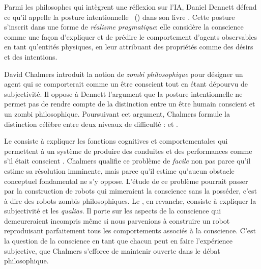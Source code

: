 \begin{quote}
	\cite{bach_california_2025}
\end{quote}

Parmi les philosophes qui intègrent une réflexion sur l'IA, Daniel Dennett défend ce qu'il appelle la \og posture intentionnelle \fg\ () dans son livre  \cite{dennett_consciousness_1991}. 
Cette posture s'inscrit dans une forme de  \textit{réalisme pragmatique}: elle considère la conscience comme une façon d'expliquer et de prédire le comportement d'agents observables en tant qu'entités physiques, en leur attribuant des propriétés comme des désirs et des intentions. 

David Chalmers introduit la notion de \emph{zombi philosophique} pour désigner un agent qui se comporterait comme un être conscient tout en étant dépourvu de subjectivité. 
Il oppose à Dennett l'argument que la posture intentionnelle ne permet pas de rendre compte de la distinction entre un être humain conscient et un zombi philosophique. 
Poursuivant cet argument, 
Chalmers formule la distinction célèbre entre deux niveaux de difficulté :  et  \cite{chalmers_conscious_1997}.

Le  consiste à expliquer les fonctions cognitives et comportementales qui permettent à un système de produire des conduites et des performances \og comme s'il était conscient \fg{}. 
Chalmers qualifie ce problème de \emph{facile} non pas parce qu'il estime sa résolution imminente,  mais parce qu'il estime qu'aucun obstacle conceptuel fondamental ne s'y oppose. 
L'étude de ce problème pourrait passer par la construction de robots qui mimeraient la conscience sans la posséder, c'est à dire des robots zombis philosophiques. 
Le , en revanche, consiste à expliquer la subjectivité et les \emph{qualias}. 
Il porte sur les aspects de la conscience qui demeureraient incompris même si nous parvenions à construire un robot reproduisant parfaitement tous les comportements associés à la conscience. 
C'est la question de la conscience en tant que chacun peut en faire l'expérience subjective, que Chalmers s'efforce de maintenir ouverte dans le débat philosophique.

